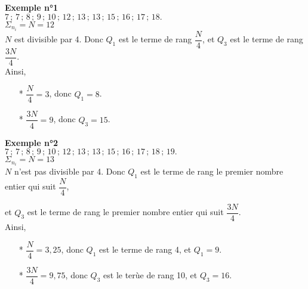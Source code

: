 \vspace*{.3cm}

\textbf{Exemple n°1} \\



$ 7 \, ; \,  7 \, ; \,  8 \, ; \,  9 \, ; \,  10 \, ; \,  12 \, ; \,  13 \, ; \,  13 \, ; \,  15 \, ; \,  16 \, ; \,  17 \, ; \,  18.$ \\

$\Sigma_{n_i} = N = 12$ \\

$N$ est divisible par 4. Donc $Q_1$ est le terme de rang $\dfrac{N}{4}$, et $Q_3$ est le terme de rang $\dfrac{3N}{4}$. \\

Ainsi,  \\

\begin{itemize}
\item[*] $\dfrac{N}{4} = 3$, donc $Q_1 = 8$.
\\
\item[*] $ \dfrac{3N}{4} = 9$, donc $Q_3 = 15$.
\end{itemize}

\vspace*{.3cm}

\textbf{Exemple n°2} \\

$ 7 \, ; \,  7 \, ; \,  8 \, ; \,  9 \, ; \,  10 \, ; \,  12 \, ; \,  13 \, ; \,  13 \, ; \,  15 \, ; \,  16 \, ; \,  17 \, ; \,  18 \, ; \,  19.$ \\

$\Sigma_{n_i} = N = 13$ \\

$N$ n'est pas divisible par 4. Donc $Q_1$ est le terme de rang le premier nombre entier qui suit $\dfrac{N}{4}$, 

et $Q_3$ est le terme de rang le premier nombre entier qui suit $\dfrac{3N}{4}$. \\

Ainsi,  \\

\begin{itemize}
\item[*] $\dfrac{N}{4} = 3,25$, donc $Q_1$ est le terme de rang 4, et $Q_1 = 9$.
\\
\item[*] $ \dfrac{3N}{4} = 9,75$, donc $Q_3$ est le terùe de rang 10, et $Q_3 = 16$.
\end{itemize}

